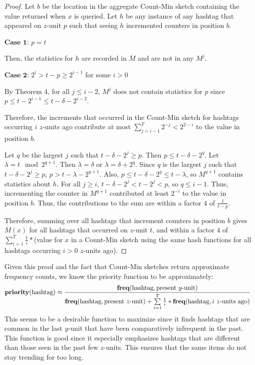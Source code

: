 \documentclass[twoside]{article}
\begin{document}
{\begin{proof}
Let $b$ be the location in the aggregate Count-Min sketch containing the value returned when $x$ is queried.
Let $h$ be any instance of any hashtag that appeared on $z$-unit $p$ such that seeing $h$ incremented counters in position $b$.

\bigskip

\noindent $\textbf{Case 1}$: $p=t$

Then, the statistics for $h$ are recorded in $\overline{M}$ and are not in any $M^j$.

\noindent $\textbf{Case 2}$: $2^i > t-p \geq 2^{i-1}$ for some $i > 0$

By Theorem 4, for all $j \leq i - 2$, $M^j$ does not contain statistics for $p$ since $p \leq t - 2^{i-1} \leq t - \delta - 2^{i-2}$.

\bigskip

Therefore, the increments that occurred in the Count-Min sketch for hashtags occurring $i$ $z$-units ago contribute at most $\sum\limits_{j = i - 1}^{T} 2^{-j} < 2^{2-i}$ to the value in position $b$.

Let $q$ be the largest $j$ such that $t - \delta - 2^j \geq p$.
Then $p \leq t - \delta - 2^q$.  Let $\lambda = t \mod 2^{q+1}$.  Then $\lambda = \delta$ or $\lambda = \delta + 2^q$.
Since $q$ is the largest $j$ such that $t - \delta - 2^j \geq p$, $p > t - \lambda - 2^{q+1}$.
Also, $p \leq t - \delta - 2^q \leq t - \lambda$, so $M^{q+1}$ contains statistics about $h$.
For all $j \geq i$, $t - \delta - 2^j < t - 2^j < p$, so $q \leq i - 1$. 
Thus, incrementing the counter in $M^{q + 1}$ contributed at least $2^{-i}$ to the value in position $b$.
Thus, the contributions to the sum are within a factor $4$ of $\frac{1}{t-p}$.

Therefore, summing over all hashtags that increment counters in position $b$ gives $\overline{M}(x)$ for all hashtags that occurred on $z$-unit $t$, and within a factor $4$ of $\sum\limits_{i=1}^T \frac{1}{i}*$(value for $x$ in a Count-Min sketch using the same hash functions for all hashtags occurring $i > 0$ $z$-units ago). 
\end{proof}

Given this proof and the fact that Count-Min sketches return approximate frequency counts, we know the priority function to be approximately:
\begin{equation} 
\label{eq:approxpriority}
\textbf{priority}(\textnormal{hashtag}) \approx \frac{\textbf{freq}(\textnormal{hashtag}, \textnormal{present } y \textnormal{-unit})}{\textbf{freq}(\textnormal{hashtag}, \textnormal{present } z \textnormal{-unit}) + \sum\limits_{i=1}^T \frac{1}{i}* \textbf{freq}(\textnormal{hashtag}, i \ z \textnormal{-units ago})}
\end{equation}
This seems to be a desirable function to maximize since it finds hashtags that are common in the last $y$-unit that have been comparatively infrequent in the past. This function is good since it especially emphasizes hashtags that are different than those seen in the past few $z$-units.  This ensures that the same items do not stay trending for too long. 

}
\end{document}
